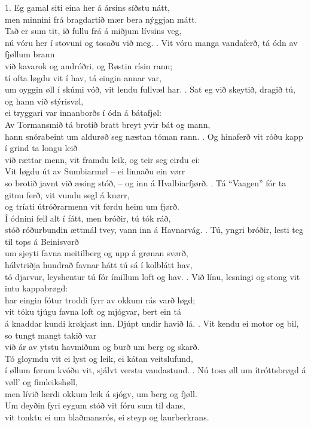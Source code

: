 \begin{flushleft}
1. Eg gamal siti eina her á ársins síðstu nátt, \\
men minnini frá bragdartíð mær bera nýggjan mátt. \\
Tað er sum tit, ið fullu frá á miðjum lívsins veg, \\
nú vóru her í stovuni og tosaðu við meg. 
. Vit vóru manga vandaferð, tá ódn av fjøllum brann \\
við kavarok og andróðri, og Røstin rísin rann;\\ 
tí ofta løgdu vit í hav, tá eingin annar var,\\
um oyggin øll í skúmi vóð, vit lendu fullvæl har.
. Sat eg við skeytið, dragið tú, og hann við stýrisvøl, \\
ei tryggari var innanborðs í ódn á bátafjøl: \\
Av Tormansmið tá brotið bratt breyt yvir bát og mann, \\
hann snórabeint um aldurøð seg næstan tóman rann.
. Og hinaferð vit róðu kapp í grind ta longu leið \\
við rættar menn, vit framdu leik, og teir seg eirdu ei: \\
Vit løgdu út av Sumbiarmøl – ei linnaðu ein vørr\\
so brotið javnt við æsing stóð, – og inn á Hvalbiarfjørð.
. Tá “Vaagen” fór ta gitnu ferð, vit vundu segl á knørr, \\
og tríati útróðrarmenn vit førdu heim um fjørð. \\
Í ódnini fell alt í fátt, men bróðir, tú tók ráð, \\
stóð róðurbundin ættmál tvey, vann inn á Havnarvág.
. Tú, yngri bróðir, lesti teg til tops á Beinisvørð \\
um sjeyti favna meitilberg og upp á grønan svørð, \\
hálvtriðja hundrað favnar hátt tú sá í kolblátt hav, \\
tó djarvur, leyshentur tú fór ímillum loft og hav. 
. Við línu, lesningi og stong vit intu kappabrøgd: \\
har eingin fótur troddi fyrr av okkum rás varð løgd; \\
vit tóku tjúgu favna loft og mjógvar, bert ein tá \\
á knaddar kundi krøkjast inn. Djúpt undir havið lá.
. Vit kendu ei motor og bil, so tungt mangt takið var \\
við ár av ytstu havmiðum og burð um berg og skarð. \\
Tó gloymdu vit ei lyst og leik, ei kátan veitslufund, \\
í øllum førum kvóðu vit, sjálvt verstu vandastund.
. Nú tosa øll um ítróttsbrøgd á vøll’ og fimleikshøll, \\
men lívið lærdi okkum leik á sjógv, um berg og fjøll. \\
Um deyðin fyri eygum stóð vit fóru sum til dans, \\
vit tonktu ei um blaðmansrós, ei steyp og laurberkrans.
\end{flushleft}
\newpage